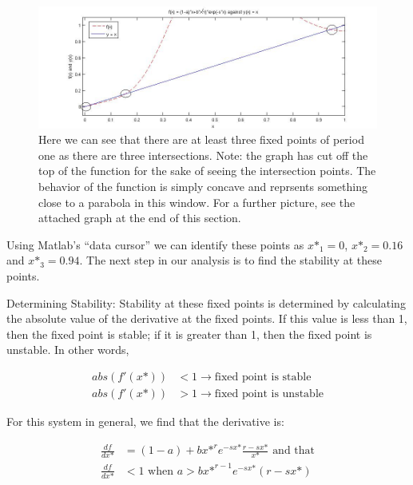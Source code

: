 \documentclass[12pt]{article}
\begin{document}
\begin{figure}[H]
    \begin{center}
    \includegraphics[width=\textwidth]{P1_Q2}
    \end{center}
    \caption{Here we can see that there are at least three fixed points of period one as there are three intersections. Note: the graph has cut off the top of the function for the sake of seeing the intersection points. The behavior of the function is simply concave and reprsents something close to a parabola in this window. For a further picture, see the attached graph at the end of this section.}
    \label{figure:2.1}
\end{figure}

Using Matlab's ``data cursor'' we can identify these points as $x\text{*}_{1} = 0$, $x\text{*}_{2} = 0.16$ and $x\text{*}_{3} = 0.94$. The next step in our analysis is to find the stability at these points.

Determining Stability: Stability at these fixed points is determined by calculating the absolute value of the derivative at the fixed points. If this value is less than 1, then the fixed point is stable; if it is greater than 1, then the fixed point is unstable. In other words,

\begin{align*}
abs(f'(x\text{*})) &< 1 \rightarrow \text{fixed point is stable} \\
abs(f'(x\text{*})) &> 1 \rightarrow \text{fixed point is unstable}
\end{align*}

For this system in general, we find that the derivative is:

\begin{align*}
	\frac{df}{dx\text{*}} &= (1-a) + bx\text{*}^{r}e^{-sx\text{*}}\frac{r-sx\text{*}}{x\text{*}} \text{ and that} \\
	\frac{df}{dx\text{*}} &< 1 \text{ when } a > bx\text{*}^{r-1}e^{-sx\text{*}}(r-sx\text{*})
\end{align*}
\end{document}
